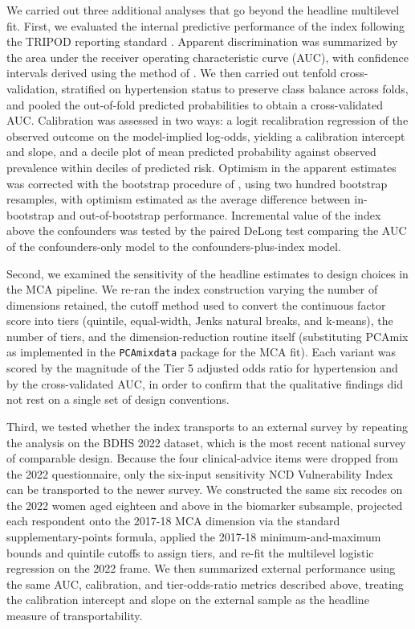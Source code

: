 \documentclass[
  12pt,
  a4paper]{article}
\begin{document}
We carried out three additional analyses that go beyond the headline multilevel fit. First, we evaluated the internal predictive performance of the index following the TRIPOD reporting standard \citep{moons_tripod_2015}. Apparent discrimination was summarized by the area under the receiver operating characteristic curve (AUC), with confidence intervals derived using the method of \citet{delong_areas_1988}. We then carried out tenfold cross-validation, stratified on hypertension status to preserve class balance across folds, and pooled the out-of-fold predicted probabilities to obtain a cross-validated AUC. Calibration was assessed in two ways: a logit recalibration regression of the observed outcome on the model-implied log-odds, yielding a calibration intercept and slope, and a decile plot of mean predicted probability against observed prevalence within deciles of predicted risk. Optimism in the apparent estimates was corrected with the bootstrap procedure of \citet{harrell_regression_2015}, using two hundred bootstrap resamples, with optimism estimated as the average difference between in-bootstrap and out-of-bootstrap performance. Incremental value of the index above the confounders was tested by the paired DeLong test comparing the AUC of the confounders-only model to the confounders-plus-index model.

Second, we examined the sensitivity of the headline estimates to design choices in the MCA pipeline. We re-ran the index construction varying the number of dimensions retained, the cutoff method used to convert the continuous factor score into tiers (quintile, equal-width, Jenks natural breaks, and k-means), the number of tiers, and the dimension-reduction routine itself (substituting PCAmix as implemented in the \texttt{PCAmixdata} package for the MCA fit). Each variant was scored by the magnitude of the Tier 5 adjusted odds ratio for hypertension and by the cross-validated AUC, in order to confirm that the qualitative findings did not rest on a single set of design conventions.

Third, we tested whether the index transports to an external survey by repeating the analysis on the BDHS 2022 dataset, which is the most recent national survey of comparable design. Because the four clinical-advice items were dropped from the 2022 questionnaire, only the six-input sensitivity NCD Vulnerability Index can be transported to the newer survey. We constructed the same six recodes on the 2022 women aged eighteen and above in the biomarker subsample, projected each respondent onto the 2017-18 MCA dimension via the standard supplementary-points formula, applied the 2017-18 minimum-and-maximum bounds and quintile cutoffs to assign tiers, and re-fit the multilevel logistic regression on the 2022 frame. We then summarized external performance using the same AUC, calibration, and tier-odds-ratio metrics described above, treating the calibration intercept and slope on the external sample as the headline measure of transportability.
\end{document}
